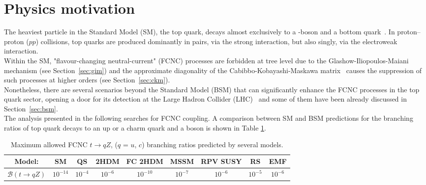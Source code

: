 \section{Physics motivation}
The heaviest particle in the Standard Model (SM), the top quark, decays almost exclusively to a \PW-boson and a bottom quark~\cite{pdg2}. In proton--proton ($pp$) collisions, top quarks are produced dominantly in pairs, via the strong interaction, but also singly, via the electroweak interaction. \\%
Within the SM, "flavour-changing neutral-current" (FCNC) processes are forbidden at tree level due to the Glashow-Iliopoulos-Maiani mechanism \cite{gim} (see Section~\ref{sec:gim}) and the approximate diagonality of the Cabibbo-Kobayashi-Maskawa matrix~\cite{pdg2} causes the suppression of such processes at higher orders (see Section~\ref{sec:ckm}).\\
Nonetheless, there are several scenarios beyond the Standard Model (BSM) that can significantly enhance the FCNC processes in the top quark sector, opening a door for its detection at the Large Hadron Collider (LHC)~\cite{aguilar,barger,h2dm_limit,mssm_limit,RPV_limit, extra_limit} and some of them have been already discussed in Section~\ref{sec:bsm}. \\
The analysis presented in the following searches for FCNC \tZc coupling. A comparison between SM and BSM predictions for the branching ratios of top quark decays to an up or a charm quark and a \PZ boson is shown in Table \ref{tab:intro-fcnc-br-th}.\\

\begin{table}[h]
	\begin{adjustbox}{max width=1.\textwidth,center}
		\begin{tabular}{ccccccccc}
			\hline 
			Model:&  			                         SM&  				   QS&  			   2HDM&  				FC 2HDM				& MSSM 			&  RPV SUSY			&  			RS				& EMF \\ 
			\hline 
			$\mathcal{B}(t\rightarrow qZ)$ & $10^{-14}$     & $10^{-4}$ &  $10^{-6}$          & $10^{-10}$  & $10^{-7}$      &$10^{-6}$            & $10^{-5}$           & $10^{-6}$  \\ 
			\hline 
		\end{tabular} 
	\end{adjustbox}
	\caption{Maximum allowed FCNC $t\rightarrow qZ$, ($q$ = $u$, $c$) branching ratios predicted by several models\cite{tcZ_sm,qs_limit,h2dm_limit,mssm_limit,RPV_limit,extra_limit,rs_limit,report_limit}.}
	\label{tab:intro-fcnc-br-th}
\end{table} 

